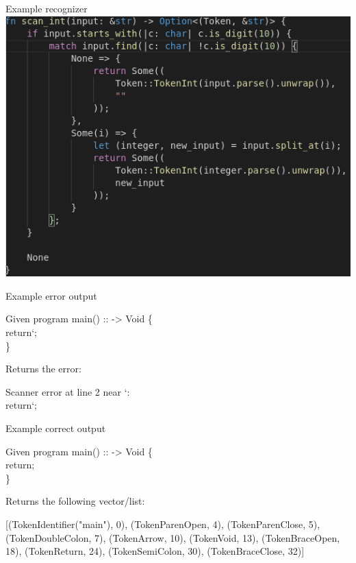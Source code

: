 \documentclass[10pt]{beamer}
\begin{document}
\begin{frame}{Example recognizer}
    \includegraphics[width=\textwidth]{scan_int.png}
\end{frame}

\begin{frame}{Example error output}
    \begin{block}{Given program}
    main() :: -> Void \{\\
        \hspace{1cm} return`;\\
    \}
    \end{block}
    Returns the error:
    \begin{block}{}
    Scanner error at line 2 near `:\\
        \hspace{1cm} return`;
    \end{block}
\end{frame}

\begin{frame}{Example correct output}
    \begin{block}{Given program}
    main() :: -> Void \{\\
        \hspace{1cm} return;\\
    \}
    \end{block}
    Returns the following vector/list:
    \begin{block}{}
    [(TokenIdentifier("main"), 0), (TokenParenOpen, 4), (TokenParenClose, 5), (TokenDoubleColon, 7), (TokenArrow, 10), (TokenVoid, 13), (TokenBraceOpen, 18), (TokenReturn, 24), (TokenSemiColon, 30), (TokenBraceClose, 32)]
    \end{block}
\end{frame}
\end{document}
